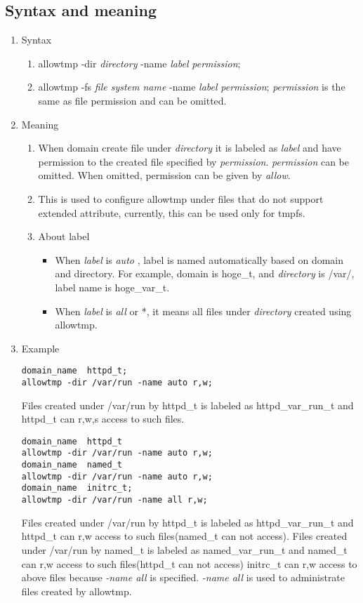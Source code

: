 \documentclass{article}
\begin{document}
\subsection{Syntax and meaning}
\begin{enumerate}
 \item Syntax
       \begin{enumerate}
	\item allowtmp -dir {\it directory} -name {\it label} {\it
	      permission};
	\item  allowtmp -fs {\it file system name} -name {\it label} {\it
	      permission};
	      {\it permission} is the same as file permission and can be omitted.
       \end{enumerate}
 \item Meaning\\
       \begin{enumerate}
	\item When domain create file under {\it directory} it is
	      labeled as {\it label} and have permission to the created
	      file specified by {\it permission}. {\it permission} can
	      be omitted. When omitted, permission can be given by {\it allow}.
	\item This is used to configure allowtmp under files that do not
	      support extended attribute, currently, this can be used
	      only for tmpfs.
	\item About label
	      \begin{itemize}
	       \item When {\it label} is {\it auto }, label is named
		     automatically based on domain and directory. For example,
		     domain is hoge\_t, and {\it directory} is /var/, label
		     name is hoge\_var\_t.
	       \item When {\it label} is {\it all} or *, it means all
		     files under {\it directory} created using allowtmp.
	      \end{itemize}           
       \end{enumerate}       
 \item Example\\
       \begin{verbatim}
domain_name  httpd_t;
allowtmp -dir /var/run -name auto r,w;
       \end{verbatim}
Files created under /var/run by httpd\_t is labeled as
       httpd\_var\_run\_t and httpd\_t can r,w,s access to such files.

\begin{verbatim}
domain_name  httpd_t
allowtmp -dir /var/run -name auto r,w;
domain_name  named_t
allowtmp -dir /var/run -name auto r,w;
domain_name  initrc_t;
allowtmp -dir /var/run -name all r,w;
\end{verbatim}
Files created under /var/run by httpd\_t is labeled as
       httpd\_var\_run\_t and httpd\_t can r,w access to such
       files(named\_t can not access).
Files created under /var/run by named\_t is labeled as
       named\_var\_run\_t and named\_t can r,w access to such
       files(httpd\_t can not access)
initrc\_t can r,w access to above files because {\it -name all} is
       specified. {\it -name all} is used to administrate files created
       by allowtmp.


\end{enumerate}
\end{document}
